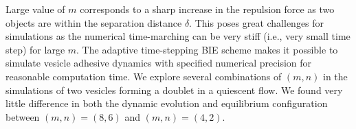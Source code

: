 \documentclass[prf,superscriptaddress,showpacs]{revtex4-1}
\begin{document}
 Large value of $m$ corresponds to a sharp increase in the repulsion force as two objects are within the separation distance $\delta$.
 This poses great challenges for simulations as the numerical time-marching can be very stiff (i.e., very small time step) for large $m$. 
 The adaptive time-stepping BIE scheme makes it possible to simulate vesicle adhesive dynamics with specified numerical precision for reasonable computation time.
 We explore several combinations of $(m,n)$ in the simulations 
 of two vesicles forming a doublet in a quiescent flow.
 We found very little difference in both the dynamic evolution and equilibrium configuration between $(m,n)=(8,6)$ and $(m,n)=(4,2)$.
 
 

 
%


\end{document}
